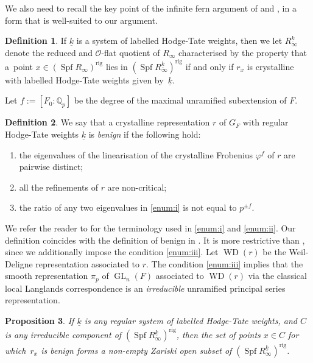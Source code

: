 \documentclass[11pt]{article}
\let\mathcal\mathscr
\newenvironment{enumeratei}
{\bgroup\def\theenumi{\roman{enumi}}\def\theenumii{\arabic{enumii}}\begin{enumerate}}
{\end{enumerate}\egroup}
\newtheorem{prop}{Proposition}[section]
\theoremstyle{definition}
\newtheorem{defi}[prop]{Definition}
\DeclareMathOperator{\Spf}{Spf}
\DeclareMathOperator{\GL}{GL}
\DeclareMathOperator{\WD}{WD}
\newcommand{\Qp}{\mathbb {Q}_p}
\newcommand{\cO}{\mathcal{O}}
\newcommand\rig{\mathrm{rig}}
\begin{document}
We also need to recall the key point of the infinite fern argument
of \cite{Chenevier} and \cite{Nakamura}, in a form that
is well-suited to our argument.

\begin{defi} If $\underline{k}$ is a system of
labelled Hodge-Tate weights,
then we let $R^{\underline{k}}_{\infty}$ denote the reduced and $\cO$-flat
quotient of $R_{\infty}$ characterised by the property that a~point $x \in (\Spf R_{\infty})^{\rig}$ lies in
$(\Spf R^{\underline{k}}_{\infty})^{\rig}$ if and only if
$r_x$ is crystalline with labelled Hodge-Tate weights given
by~$\underline{k}$.
\end{defi}

Let $f:=[F_0: \Qp]$ be the degree of the maximal unramified subextension of $F$.
\begin{defi}\label{defi:benign}
We say that a crystalline representation $r$ of $G_F$ with regular Hodge-Tate weights $\underline{k}$
is \textit{benign} if the following hold:
\begin{enumeratei}
\item\label{enum:i}
the eigenvalues of the linearisation of the crystalline Frobenius $\varphi^f$ of $r$ are pairwise distinct;
\item\label{enum:ii}
all the refinements of $r$ are non-critical;
\item\label{enum:iii}
the ratio of any two eigenvalues in \eqref{enum:i} is not equal to $p^{\pm f}$.
\end{enumeratei}
\end{defi}
We refer the reader to \cite[\S 2.3]{BHS} for the terminology used in \eqref{enum:i} and \eqref{enum:ii}. Our definition coincides
with the definition of benign in \cite[Def.\,2.8]{Nakamura}. It is more restrictive than \hbox{\cite[Def.\,2.8]{BHS}},
since we additionally impose the condition \eqref{enum:iii}. Let $\WD(r)$ be the Weil-Deligne representation associated to $r$. The
condition \eqref{enum:iii} implies that the smooth representation $\pi_p$ of $\GL_n(F)$ associated to $\WD(r)$ via the classical local
Langlands correspondence is an \textit{irreducible} unramified principal series representation.

\begin{prop}
\label{prop:benign}
If $\underline{k}$ is any regular system of labelled Hodge-Tate weights,
and $C$ is any irreducible component of
$(\Spf R_{\infty}^{\underline{k}})^{\rig}$,
then the set of points $x \in C$ for which~$r_x$ is benign
forms a non-empty Zariski open subset
of $(\Spf R_{\infty}^{\underline{k}})^{\rig}$.
\end{prop}
\end{document}
